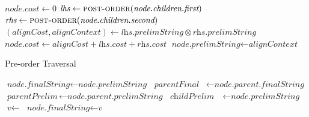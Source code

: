 \documentclass{bmcart}
\begin{document}
\begin{backmatter}
\begin{algorithm}
\begin{algorithmic}[1]
			\State $\textit{node.cost} \gets 0$
			\Else
			\State $\textit{lhs}  \gets \Call{post-order}{\textit{node.children.first}}$
			\State $\textit{rhs}  \gets \Call{post-order}{\textit{node.children.second}}$
			\State $\left(\textit{alignCost}, \textit{alignContext}\right) \gets \textit{lhs.prelimString} \otimes \textit{rhs.prelimString}$ 
			\State $\textit{node.cost} \gets \textit{alignCost} + \textit{lhs.cost} + \textit{rhs.cost}$
			\State $\textit{node.prelimString} \gets \textit{alignContext}$
			\EndIf
			\EndFunction
		\end{algorithmic}
	\end{algorithm}

    \begin{algorithm}
		\caption{Pre-order Traversal}\label{Alg:pre-order}
		\begin{algorithmic}[1]
			 
			\State $\textit{node.finalString} \gets \textit{node.prelimString}$
			\Else  {}
			\State $\textit{parentFinal} \;\;\; \gets \textit{node.parent.finalString}$
			\State $\textit{parentPrelim}    \, \gets \textit{node.parent.prelimString}$
			\State $\textit{childPrelim} \;\;\;\, \gets \textit{node.prelimString}$
			\State $\textit{v} \gets$ 
			\State $\textit{node.finalString} \gets \textit{v}$
			\EndIf
			\EndFunction
			
		\end{algorithmic}
    \end{algorithm}


\end{backmatter}
\end{document}
